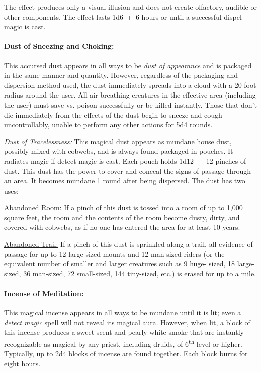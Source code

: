 \begin{multicols}{2}
The effect produces only a visual illusion and does not create olfactory, audible or other components.  The effect lasts 1d6~+~6 hours or until a successful dispel magic is cast.  

\paragraph{Dust of Sneezing and Choking:} This accursed dust appears in all ways to be \textit{dust of appearance} and is packaged in the same manner and quantity.  However, regardless of the packaging and dispersion method used, the dust immediately spreads into a cloud with a 20-foot radius around the user.  All air-breathing creatures in the effective area (including the user) must save vs. poison successfully or be killed instantly.  Those that don't die immediately from the effects of the dust begin to sneeze and cough uncontrollably, unable to perform any other actions for 5d4 rounds.

\textit{Dust of Tracelessness:} This magical dust appears as mundane house dust, possibly mixed with cobwebs, and is always found packaged in pouches.  It radiates magic if detect magic is cast.  Each pouch holds 1d12~+~12 pinches of dust.  This dust has the power to cover and conceal the signs of passage through an area.  It becomes mundane 1 round after being dispersed.  The dust has two uses:

\underline{Abandoned Room:} If a pinch of this dust is tossed into a room of up to 1,000 square feet, the room and the contents of the room become dusty, dirty, and covered with cobwebs, as if no one has entered the area for at least 10 years.

\underline{Abandoned Trail:} If a pinch of this dust is sprinkled along a trail, all evidence of passage for up to 12 large-sized mounts and 12 man-sized riders (or the equivalent number of smaller and larger creatures such as 9 huge- sized, 18 large-sized, 36 man-sized, 72 small-sized, 144 tiny-sized, etc.) is erased for up to a mile.

\paragraph{Incense of Meditation:} This magical incense appears in all ways to be mundane until it is lit; even a \textit{detect magic} spell will not reveal its magical aura.  However, when lit, a block of this incense produces a sweet scent and pearly white smoke that are instantly recognizable as magical by any priest, including druids, of 6\textsuperscript{th} level or higher.  Typically, up to 2d4 blocks of incense are found together.  Each block burns for eight hours.


\end{multicols}
